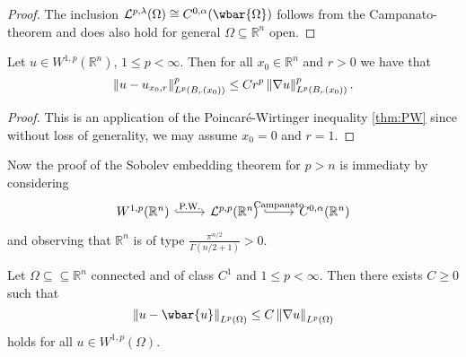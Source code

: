 \begin{proof}
	The inclusion $\mathcal{L}^{p,\lambda}(\Omega) \cong C^{0,\alpha}(\wbar{\Omega})$ follows from the Campanato-theorem and does also hold for general $\Omega \subseteq \mathbb{R}^n$ open.
\end{proof}

\begin{lemma}
	Let $u \in W^{1,p}(\mathbb{R}^n)$, $1 \leq p < \infty$. Then for all $x_0 \in \mathbb{R}^n$ and $r > 0$ we have that
	\begin{equation*}
		\norm[0]{u - u_{x_0,r}}_{L^p(B_r(x_0))}^p \leq Cr^p \norm[0]{\nabla u}^p_{L^p(B_r(x_0))}.
	\end{equation*}
\end{lemma}

\begin{proof}
	This is an application of the Poincar\'e-Wirtinger inequality \ref{thm:PW} since without loss of generality, we may assume $x_0 = 0$ and $r = 1$.
\end{proof}

Now the proof of the Sobolev embedding theorem for $p > n$ is immediaty by considering
\begin{equation*}
	\begin{tikzcd}
		W^{1,p}(\mathbb{R}^n) \arrow[r,"\text{P.W.}",hook] & \mathcal{L}^{p,p}(\mathbb{R}^n) \arrow[r,"\text{Campanato}",hook] & C^{0,\alpha}(\mathbb{R}^n)
	\end{tikzcd}
\end{equation*}
\noindent and observing that $\mathbb{R}^n$ is of type $\frac{\pi^{n/2}}{\Gamma(n/2 + 1)} > 0$.

\begin{theorem}
	\label{thm:PW}
	Let $\Omega \subseteq \subseteq \mathbb{R}^n$ connected and of class $C^1$ and $1 \leq p < \infty$. Then there exists $C \geq 0$ such that 
	\begin{equation*}
		\norm[0]{u - \wbar{u}}_{L^p(\Omega)} \leq C \norm[0]{\nabla u}_{L^p(\Omega)}
	\end{equation*}
	\noindent holds for all $u \in W^{1,p}(\Omega)$.
\end{theorem}

